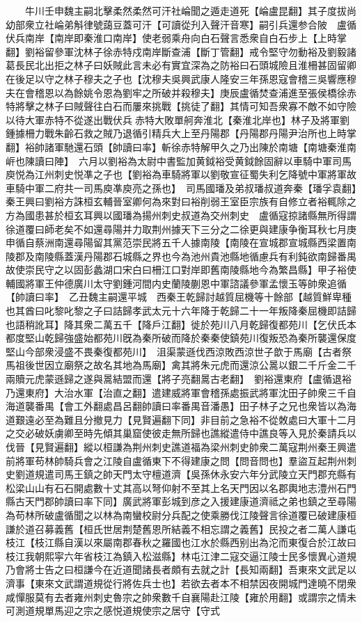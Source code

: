 　　牛川壬申魏主嗣北擊柔然柔然可汗社崘聞之遁走道死【崘盧昆翻】其子度拔尚幼部衆立社崘弟斛律號藹豆蓋可汗【可讀從刋入聲汗音寒】嗣引兵還参合陂　盧循伏兵南岸【南岸即秦淮口南岸】使老弱乘舟向白石聲言悉衆自白石步上【上時掌翻】劉裕留參軍沈林子徐赤特戍南岸斷查浦【斷丁管翻】戒令堅守勿動裕及劉毅諸葛長民北出拒之林子曰妖賊此言未必有實宜深為之防裕曰石頭城險且淮柵甚固留卿在後足以守之林子穆夫之子也【沈穆夫吳興武康人隆安三年孫恩寇會稽三吳響應穆夫在會稽恩以為餘姚令恩為劉牢之所破并殺穆夫】庚辰盧循焚查浦進至張侯橋徐赤特將擊之林子曰賊聲往白石而屢來挑戰【挑徒了翻】其情可知吾衆寡不敵不如守險以待大軍赤特不從遂出戰伏兵赤特大敗單舸奔淮北【秦淮北岸也】林子及將軍劉鍾據柵力戰朱齡石救之賊乃退循引精兵大上至丹陽郡【丹陽郡丹陽尹治所也上時掌翻】裕帥諸軍馳還石頭【帥讀曰率】斬徐赤特解甲久之乃出陳於南塘【南塘秦淮南㟁也陳讀曰陣】　六月以劉裕為太尉中書監加黄鉞裕受黄鉞餘固辭以車騎中軍司馬庾悦為江州刺史悦凖之子也【劉裕為車騎將軍以劉敬宣征蜀失利乞降號中軍將軍故車騎中軍二府共一司馬庾凖庾亮之孫也】　司馬國璠及弟叔璠叔道奔秦【璠孚袁翻】秦王興曰劉裕方誅桓玄輔晉室卿何為來對曰裕削弱王室臣宗族有自修立者裕輒除之方為國患甚於桓玄耳興以國璠為揚州刺史叔道為交州刺史　盧循寇掠諸縣無所得謂徐道覆曰師老矣不如還尋陽并力取荆州據天下三分之二徐更與建康争衡耳秋七月庚申循自蔡洲南還尋陽留其黨范崇民將五千人據南陵【南陵在宣城郡宣城縣西梁置南陵郡及南陵縣蓋漢丹陽郡石城縣之界也今為池州貴池縣地循慮兵有利鈍欲南歸番禺故使崇民守之以固彭蠡湖口宋白曰柵江口對岸即舊南陵縣地今為繁昌縣】甲子裕使輔國將軍王仲德廣川太守劉鍾河間内史蘭陵蒯恩中軍諮議參軍孟懷玉等帥衆追循【帥讀曰率】　乙丑魏主嗣還平城　西秦王乾歸討越質屈機等十餘部【越質鮮卑種也其酋曰叱黎叱黎之子曰詰歸孝武太元十六年降于乾歸二十一年叛降秦屈機即詰歸也語稍訛耳】降其衆二萬五千【降戶江翻】徙於苑川八月乾歸復都苑川【乞伏氏本都度堅山乾歸強盛始都苑川旣為秦所破而降於秦秦使鎮苑川復叛恐為秦所襲還保度堅山今部衆浸盛不畏秦復都苑川】　沮渠蒙遜伐西涼敗西涼世子歆于馬廟【古者祭馬祖後世因立廟祭之故名其地為馬廟】禽其將朱元虎而還涼公暠以銀二千斤金二千兩贖元虎蒙遜歸之遂與暠結盟而還【將子亮翻暠古老翻】　劉裕還東府【盧循退裕乃還東府】大治水軍【治直之翻】遣建威將軍會稽孫處振武將軍沈田子帥衆三千自海道襲番禺【會工外翻處昌呂翻帥讀曰率番禺音潘愚】田子林子之兄也衆皆以為海道艱遠必至為難且分撤見力【見賢遍翻下同】非目前之急裕不從敇處曰大軍十二月之交必破妖虜卿至時先傾其巢窟使彼走無所歸也譙縱遣侍中譙良等入見於秦請兵以伐晉【見賢遍翻】縱以桓謙為荆州刺史譙道福為梁州刺史帥衆二萬寇荆州秦王興遣前將軍苟林帥騎兵會之江陵自盧循東下不得建康之問【問音問也】羣盜互起荆州刺史劉道規遣司馬王鎮之帥天門太守檀道濟【吳孫休永安六年分武陵立天門郡充縣有松梁山山有石石開處數十丈其高以弩仰射不至其上名天門因以名郡輿地志澧州石門縣古天門郡帥讀曰率下同】廣武將軍彭城到彦之入援建康道濟祗之弟也鎮之至尋陽為苟林所破盧循聞之以林為南蠻校尉分兵配之使乘勝伐江陵聲言徐道覆已破建康桓謙於道召募義舊【桓氏世居荆楚舊恩所結義不相忘謂之義舊】民投之者二萬人謙屯枝江【枝江縣自漢以來屬南郡春秋之羅國也江水於縣西别出為沱而東復合於江故曰枝江我朝熙寜六年省枝江為鎮入松滋縣】林屯江津二寇交逼江陵士民多懷異心道規乃會將士告之曰桓謙今在近道聞諸長者頗有去就之計【長知兩翻】吾東來文武足以濟事【東來文武謂道規從行將佐兵士也】若欲去者本不相禁因夜開城門達曉不閉衆咸憚服莫有去者雍州刺史魯宗之帥衆數千自襄陽赴江陵【雍於用翻】或謂宗之情未可測道規單馬迎之宗之感悦道規使宗之居守【守式